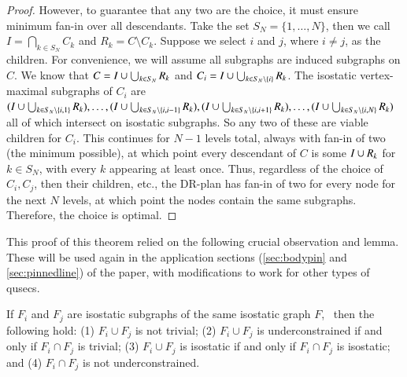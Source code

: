 \begin{proof}
However, to guarantee that any two are the  choice, it must ensure minimum fan-in over all descendants. Take the set $S_N=\{1,\dots,N\}$, then we call $I=\bigcap_{k\in S_N}{C_k}$ and $R_k=C\setminus C_k$. Suppose we select $i$ and $j$, where $i\neq j$, as the children. For convenience, we will assume all subgraphs are induced subgraphs on $C$. We know that $C=I\cup\bigcup_{k\in S_N}{R_k}$ and $C_i=I\cup\bigcup_{k\in S_N\setminus\{i\}}{R_k}$. The isostatic vertex-maximal subgraphs of $C_i$ are $(I\cup\bigcup_{k\in S_N\setminus\{i,1\}}{R_k}),\ldots,(I\cup\bigcup_{k\in S_N\setminus\{i,i-1\}}{R_k}),(I\cup\bigcup_{k\in S_N\setminus\{i,i+1\}}{R_k}),\ldots,(I\cup\bigcup_{k\in S_N\setminus\{i,N\}}{R_k})$ all of which intersect on isostatic subgraphs. So any two of these are viable children for $C_i$.
This continues for $N-1$ levels total, always with fan-in of two (the minimum possible), at which point every descendant of $C$ is some $I\cup R_k$ for $k\in S_N$, with every $k$ appearing at least once. Thus, regardless of the choice of $C_i,C_j$, then their children, etc., the DR-plan has fan-in of two for every node for the next $N$ levels, at which point the nodes contain the same subgraphs. Therefore, the choice is optimal.
%
%
\end{proof}

This proof of this theorem relied on the following crucial observation and lemma. These will be used again in the application sections (\ref{sec:bodypin} and \ref{sec:pinnedline}) of the paper, with modifications to work for other types of qusecs.

\begin{observation*}\label{lemma:union_intersection}
If $F_i$ and $F_j$ are isostatic subgraphs of the same
isostatic graph $F$, \
then the following hold:
(1) $F_i\cup F_j$ is not trivial;
(2) $F_i\cup F_j$ is underconstrained if and only if $F_i\cap F_j$ is trivial;
(3) $F_i\cup F_j$ is isostatic if and only if $F_i\cap F_j$ is isostatic; and
(4) $F_i\cap F_j$ is not underconstrained.
\end{observation*}

